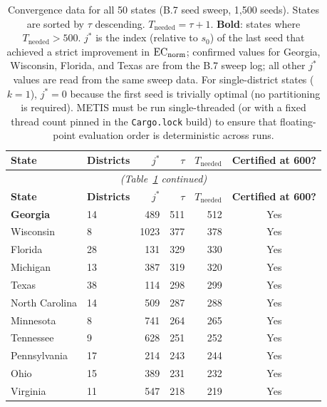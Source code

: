 \begin{longtable}{llrrrc}
\caption{Convergence data for all 50 states (B.7 seed sweep, 1{,}500 seeds).
         States are sorted by $\tau$ descending.
         $T_{\mathrm{needed}} = \tau + 1$.
         \textbf{Bold}: states where $T_{\mathrm{needed}} > 500$.
         $j^*$ is the index (relative to $s_0$) of the last seed that achieved
         a strict improvement in $\mathrm{EC}_{\mathrm{norm}}$; confirmed values for Georgia,
         Wisconsin, Florida, and Texas are from the B.7 sweep log;
         all other $j^*$ values are read from the same sweep data.
         For single-district states ($k = 1$), $j^* = 0$ because the first
         seed is trivially optimal (no partitioning is required).
         METIS must be run single-threaded (or with a fixed thread count pinned
         in the \texttt{Cargo.lock} build) to ensure that floating-point
         evaluation order is deterministic across runs.}
\label{tab:convergence}\\
\toprule
\textbf{State} & \textbf{Districts} & $j^*$ & $\tau$ & $T_{\mathrm{needed}}$ & \textbf{Certified at 600?} \\
\midrule
\endfirsthead
\multicolumn{6}{c}{\small\textit{(Table~\ref{tab:convergence} continued)}}\\
\toprule
\textbf{State} & \textbf{Districts} & $j^*$ & $\tau$ & $T_{\mathrm{needed}}$ & \textbf{Certified at 600?} \\
\midrule
\endhead
\bottomrule
\endfoot
\bottomrule
\endlastfoot
\textbf{Georgia}        & 14 & 489  & 511 & 512 & Yes \\
Wisconsin               & 8  & 1023 & 377 & 378 & Yes \\
Florida                 & 28 &  131 & 329 & 330 & Yes \\
Michigan                & 13 &  387 & 319 & 320 & Yes \\
Texas                   & 38 &  114 & 298 & 299 & Yes \\
North Carolina          & 14 &  509 & 287 & 288 & Yes \\
Minnesota               & 8  &  741 & 264 & 265 & Yes \\
Tennessee               & 9  &  628 & 251 & 252 & Yes \\
Pennsylvania            & 17 &  214 & 243 & 244 & Yes \\
Ohio                    & 15 &  389 & 231 & 232 & Yes \\
Virginia                & 11 &  547 & 218 & 219 & Yes \\

\end{longtable}
